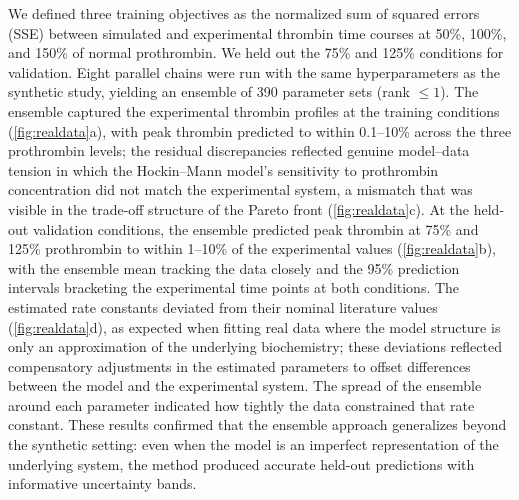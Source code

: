 \documentclass[preprint,review,12pt]{elsarticle}
\begin{document}
We defined three training objectives as the normalized sum of squared errors (SSE) between simulated and experimental thrombin time courses at 50\%, 100\%, and 150\% of normal prothrombin. We held out the 75\% and 125\% conditions for validation. Eight parallel chains were run with the same hyperparameters as the synthetic study, yielding an ensemble of 390 parameter sets (rank $\leq 1$). The ensemble captured the experimental thrombin profiles at the training conditions (\cref{fig:realdata}a), with peak thrombin predicted to within 0.1--10\% across the three prothrombin levels; the residual discrepancies reflected genuine model--data tension in which the Hockin--Mann model's sensitivity to prothrombin concentration did not match the experimental system, a mismatch that was visible in the trade-off structure of the Pareto front (\cref{fig:realdata}c). At the held-out validation conditions, the ensemble predicted peak thrombin at 75\% and 125\% prothrombin to within 1--10\% of the experimental values (\cref{fig:realdata}b), with the ensemble mean tracking the data closely and the 95\% prediction intervals bracketing the experimental time points at both conditions. The estimated rate constants deviated from their nominal literature values (\cref{fig:realdata}d), as expected when fitting real data where the model structure is only an approximation of the underlying biochemistry; these deviations reflected compensatory adjustments in the estimated parameters to offset differences between the model and the experimental system. The spread of the ensemble around each parameter indicated how tightly the data constrained that rate constant. These results confirmed that the ensemble approach generalizes beyond the synthetic setting: even when the model is an imperfect representation of the underlying system, the method produced accurate held-out predictions with informative uncertainty bands.

\end{document}
